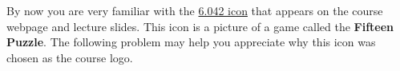 \documentclass[handout]{mcs}
\begin{document}


  By now you are very familiar with the
  \href{http://courses.csail.mit.edu/6.042/spring10}{6.042 icon} that
  appears on the course webpage and lecture slides.  This icon is a
  picture of a game called the \textbf{Fifteen Puzzle}.  The following
  problem may help you appreciate why this icon was chosen as the
  course logo.



\end{document}
